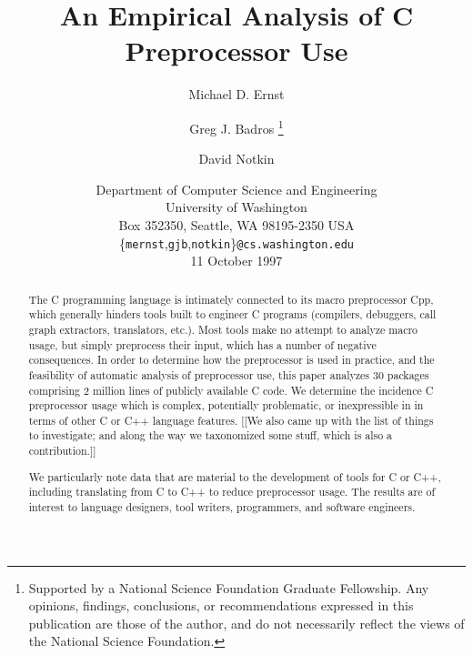 \documentclass[10pt]{article}
\def\numpackages{30}
\def\numlines{2 million}
\begin{document}
% 


\title{An Empirical Analysis of C Preprocessor Use}

\author{Michael D. Ernst%
  \and Greg J. Badros%
  \thanks{Supported by a National Science Foundation
    Graduate Fellowship. Any opinions, findings, conclusions, or
    recommendations expressed in this publication are those of the
    author, and do not necessarily reflect the views of the National
    Science Foundation.}
  \and David Notkin}

\date{%
Department of Computer Science and Engineering \\
University of Washington \\
Box 352350, Seattle, WA  98195-2350  USA \\
{\small \{{\tt mernst},{\tt gjb},{\tt notkin}\}{\tt @cs.washington.edu}} \\
11 October 1997}  

\maketitle

\begin{abstract}
  The C programming language is intimately connected to its macro
  preprocessor Cpp, which generally hinders tools built to engineer C
  programs (compilers, debuggers, call graph extractors, translators,
  etc.).  Most tools make no attempt to analyze macro usage, but simply
  preprocess their input, which has a number of negative consequences.  In
  order to determine how the preprocessor is used in practice, and the
  feasibility of automatic analysis of preprocessor use, this paper
  analyzes {\numpackages} packages comprising {\numlines} lines of publicly
  available C code.  We determine the incidence C preprocessor usage which
  is complex, potentially problematic, or inexpressible in in terms of
  other C or C++ language features.
[[We also came up with the list of things to investigate; and along the way
we taxonomized some stuff, which is also a contribution.]]

  We particularly note data that are
  material to the development of tools for C or C++, including translating
  from C to C++ to reduce preprocessor usage.  The results are of interest
  to language designers, tool writers, programmers, and software engineers.
\end{abstract}
\end{document}
